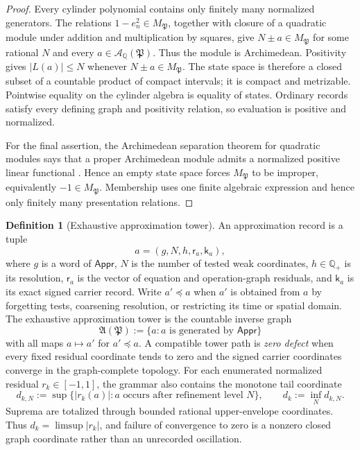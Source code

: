\documentclass[11pt]{article}
\numberwithin{section}{part}
\theoremstyle{plain}
\theoremstyle{definition}
\newtheorem{definition}[definition]{Definition}
\theoremstyle{remark}
\begin{document}
\begin{proof}
Every cylinder polynomial contains only finitely many normalized generators.
The relations \(1-e_n^2\in M_{\mathfrak P}\), together with closure of a
quadratic module under addition and multiplication by squares, give
\(N\pm a\in M_{\mathfrak P}\) for some rational \(N\) and every
\(a\in\mathcal A_{\mathbb Q}(\mathfrak P)\).  Thus the module is
Archimedean.  Positivity gives
\(|L(a)|\le N\) whenever \(N\pm a\in M_{\mathfrak P}\).  The state space is
therefore a closed subset of a countable product of compact intervals; it is
compact and metrizable.  Pointwise equality on the cylinder algebra is
equality of states.  Ordinary records satisfy every defining graph and
positivity relation, so evaluation is positive and normalized.

For the final assertion, the Archimedean separation theorem for quadratic
modules says that a proper Archimedean module admits a normalized positive
linear functional \citep{Schmudgen2017}.  Hence an empty state
space forces \(M_{\mathfrak P}\) to be improper, equivalently
\(-1\in M_{\mathfrak P}\).  Membership uses one finite algebraic expression
and hence only finitely many presentation relations.
\end{proof}

\begin{definition}[Exhaustive approximation tower]
\label{def:exhaustive-approximation-tower}
An approximation record is a tuple
\[
 a=(g,N,h,\mathsf r_a,\mathsf k_a),
\]
where \(g\) is a word of \(\mathsf{Appr}\), \(N\) is the number of tested
weak coordinates, \(h\in\mathbb Q_+\) is its resolution,
\(\mathsf r_a\) is the vector of equation and operation-graph residuals, and
\(\mathsf k_a\) is its exact signed carrier record.  Write \(a'\preceq a\)
when \(a'\) is obtained from \(a\) by forgetting tests, coarsening resolution,
or restricting its time or spatial domain.  The exhaustive approximation
tower is the countable inverse graph
\[
 \mathfrak A(\mathfrak P)
 :=\{a:\text{\(a\) is generated by }\mathsf{Appr}\}
\]
with all maps \(a\mapsto a'\) for \(a'\preceq a\).  A compatible tower path
is \emph{zero defect} when every fixed residual coordinate tends to zero and
the signed carrier coordinates converge in the graph-complete topology.
For each enumerated normalized residual \(r_k\in[-1,1]\), the grammar also contains the monotone
tail coordinate
\[
 d_{k,N}:=\sup\{|r_k(a)|:a\text{ occurs after refinement level }N\},
 \qquad d_k:=\inf_N d_{k,N}.
\]
Suprema are totalized through bounded rational upper-envelope coordinates.
Thus \(d_k=\limsup|r_k|\), and failure of convergence to zero is a nonzero
closed graph coordinate rather than an unrecorded oscillation.
\end{definition}
\end{document}
